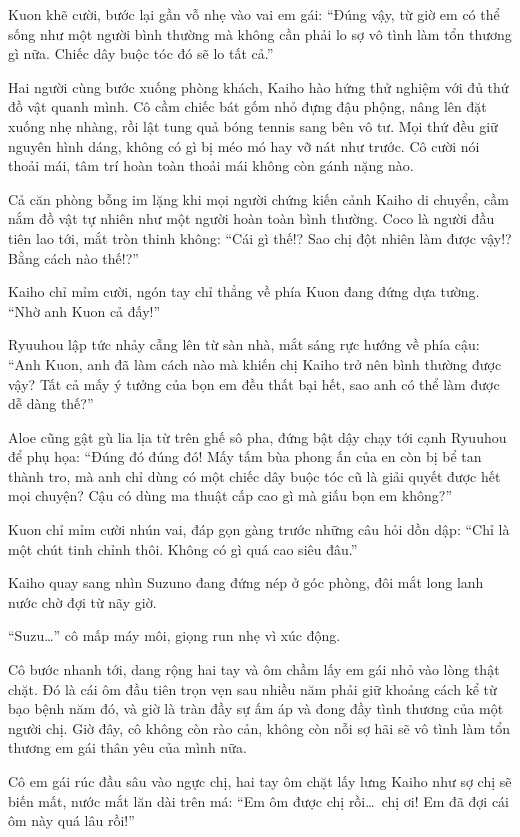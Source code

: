 ﻿\documentclass[../main.tex]{subfiles}
\begin{document}
Kuon khẽ cười, bước lại gần vỗ nhẹ vào vai em gái: ``Đúng vậy, từ giờ em có thể sống như một người bình thường mà không cần phải lo sợ vô tình làm tổn thương gì nữa. Chiếc dây buộc tóc đó sẽ lo tất cả.''


Hai người cùng bước xuống phòng khách, Kaiho hào hứng thử nghiệm với đủ thứ đồ vật quanh mình. Cô cầm chiếc bát gốm nhỏ đựng đậu phộng, nâng lên đặt xuống nhẹ nhàng, rồi lật tung quả bóng tennis sang bên vô tư. Mọi thứ đều giữ nguyên hình dáng, không có gì bị méo mó hay vỡ nát như trước. Cô cười nói thoải mái, tâm trí hoàn toàn thoải mái không còn gánh nặng nào.

Cả căn phòng bỗng im lặng khi mọi người chứng kiến cảnh Kaiho di chuyển, cầm nắm đồ vật tự nhiên như một người hoàn toàn bình thường. Coco là người đầu tiên lao tới, mắt tròn thinh không: ``Cái gì thế!? Sao chị đột nhiên làm được vậy!? Bằng cách nào thế!?'' 

Kaiho chỉ mỉm cười, ngón tay chỉ thẳng về phía Kuon đang đứng dựa tường. ``Nhờ anh Kuon cả đấy!''

Ryuuhou lập tức nhảy cẫng lên từ sàn nhà, mắt sáng rực hướng về phía cậu: ``Anh Kuon, anh đã làm cách nào mà khiến chị Kaiho trở nên bình thường được vậy? Tất cả mấy ý tưởng của bọn em đều thất bại hết, sao anh có thể làm được dễ dàng thế?''

Aloe cũng gật gù lia lịa từ trên ghế sô pha, đứng bật dậy chạy tới cạnh Ryuuhou để phụ họa: ``Đúng đó đúng đó! Mấy tấm bùa phong ấn của en còn bị bể tan thành tro, mà anh chỉ dùng có một chiếc dây buộc tóc cũ là giải quyết được hết mọi chuyện? Cậu có dùng ma thuật cấp cao gì mà giấu bọn em không?''

Kuon chỉ mỉm cười nhún vai, đáp gọn gàng trước những câu hỏi dồn dập: ``Chỉ là một chút tinh chỉnh thôi. Không có gì quá cao siêu đâu.''

Kaiho quay sang nhìn Suzuno đang đứng nép ở góc phòng, đôi mắt long lanh nước chờ đợi từ nãy giờ.

``Suzu\dots'' cô mấp máy môi, giọng run nhẹ vì xúc động.

Cô bước nhanh tới, dang rộng hai tay và ôm chầm lấy em gái nhỏ vào lòng thật chặt. Đó là cái ôm đầu tiên trọn vẹn sau nhiều năm phải giữ khoảng cách kể từ bạo bệnh năm đó, và giờ là tràn đầy sự ấm áp và đong đầy tình thương của một người chị. Giờ đây, cô không còn rào cản, không còn nỗi sợ hãi sẽ vô tình làm tổn thương em gái thân yêu của mình nữa.

Cô em gái rúc đầu sâu vào ngực chị, hai tay ôm chặt lấy lưng Kaiho như sợ chị sẽ biến mất, nước mắt lăn dài trên má: ``Em ôm được chị rồi\dots\ chị ơi! Em đã đợi cái ôm này quá lâu rồi!''
\end{document}
